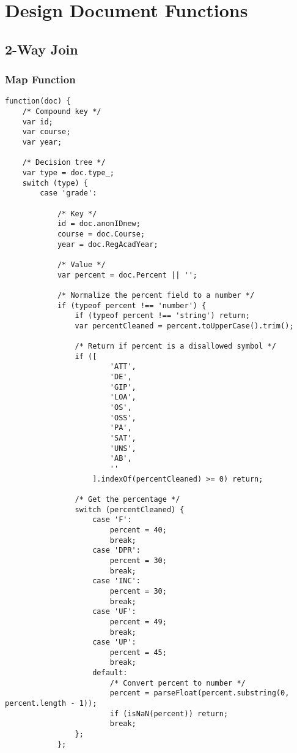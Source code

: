 \section{Design Document Functions}
\subsection{2-Way Join}
\subsubsection{Map Function}
\label{2-way-join-map-function}
\begin{verbatim}
function(doc) {
    /* Compound key */
    var id;
    var course;
    var year;

    /* Decision tree */
    var type = doc.type_;
    switch (type) {
        case 'grade':

            /* Key */
            id = doc.anonIDnew;
            course = doc.Course;
            year = doc.RegAcadYear;

            /* Value */
            var percent = doc.Percent || '';

            /* Normalize the percent field to a number */
            if (typeof percent !== 'number') {
                if (typeof percent !== 'string') return;
                var percentCleaned = percent.toUpperCase().trim();

                /* Return if percent is a disallowed symbol */
                if ([
                        'ATT',
                        'DE',
                        'GIP',
                        'LOA',
                        'OS',
                        'OSS',
                        'PA',
                        'SAT',
                        'UNS',
                        'AB',
                        ''
                    ].indexOf(percentCleaned) >= 0) return;

                /* Get the percentage */
                switch (percentCleaned) {
                    case 'F':
                        percent = 40;
                        break;
                    case 'DPR':
                        percent = 30;
                        break;
                    case 'INC':
                        percent = 30;
                        break;
                    case 'UF':
                        percent = 49;
                        break;
                    case 'UP':
                        percent = 45;
                        break;
                    default:
                        /* Convert percent to number */
                        percent = parseFloat(percent.substring(0, percent.length - 1));
                        if (isNaN(percent)) return;
                        break;
                };
            };


\end{verbatim}
